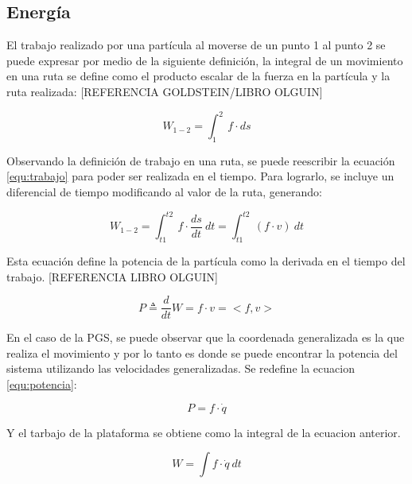\subsection{Energía}
El trabajo realizado por una partícula al moverse de un punto 1 al punto 2 se puede expresar por medio de la siguiente definición, la integral de un movimiento en una ruta se define como el producto escalar de la fuerza en la partícula y la ruta realizada: [REFERENCIA GOLDSTEIN/LIBRO OLGUIN]

\begin{equation}\label{equ:trabajo}
W_{1-2} = \int_1^2 \ f \cdot ds
\end{equation}

Observando la definición de trabajo en una ruta, se puede reescribir la ecuación \ref{equ:trabajo} para poder ser realizada en el tiempo. Para lograrlo, se incluye un diferencial de tiempo modificando al valor de la ruta, generando:

\begin{equation}\label{equ:trabajo}
W_{1-2} = \int_{t1}^{t2} \ f \cdot \frac{ds}{dt} \ dt = \int_{t1}^{t2} \ (f \cdot v) \ dt
\end{equation}

Esta ecuación define la potencia de la partícula como la derivada en el tiempo del trabajo.
[REFERENCIA LIBRO OLGUIN]

\begin{equation} \label{equ:potencia}
P \triangleq \frac{d}{dt}W = f \cdot v = <f,v>
\end{equation}

En el caso de la PGS, se puede observar que la coordenada generalizada es la que realiza el movimiento y por lo tanto es donde se puede encontrar la potencia del sistema utilizando las velocidades generalizadas. Se redefine la ecuacion \ref{equ:potencia}:

\begin{equation}
P = f \cdot \dot{q}
\end{equation}

Y el tarbajo de la plataforma se obtiene como la integral de la ecuacion anterior.

\begin{equation}\label{equ:trabajo-plat}
W = \int f \cdot \dot{q}\ dt
\end{equation}
